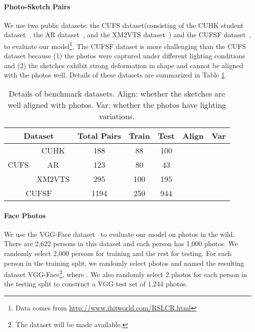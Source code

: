 \documentclass[runningheads]{llncs}
\newcommand{\cmark}{\ding{51}}
\newcommand{\xmark}{\ding{55}}
\begin{document}
\paragraph{Photo-Sketch Pairs} We use two public datasets: the CUFS dataset(consisting of the CUHK student dataset~\cite{tang2003face}, the AR dataset~\cite{martinez1998r}, and the XM2VTS dataset~\cite{Messer99xm2vtsdb}) and the CUFSF dataset~\cite{zhang2011coupled}, to evaluate our model\footnote{Data comes from \url{http://www.ihitworld.com/RSLCR.html}}. The CUFSF dataset is more challenging than the CUFS dataset because (1) the photos were captured under different lighting conditions and (2) the sketches exhibit strong deformation in shape and cannot be aligned with the photos well. Details of these datasets are summarized in Table \ref{tab:dataset}.

\begingroup
\renewcommand{\arraystretch}{1.}
\begin{table}[htbp]
\footnotesize
\caption{Details of benchmark datasets. Align: whether the sketches are well aligned with photos. Var: whether the photos have lighting variations.} \label{tab:dataset}
\centering
\begin{tabular}{c|c|ccccc}
\hline
\multicolumn{2}{c|}{Dataset} & Total Pairs  & Train & Test & Align  & Var   \\ \hline
\multirow{3}{*}{CUFS} &  CUHK    & 188    & 88    & 100  & \cmark & \xmark  \\ \cline{2-7}
&  AR      & 123    & 80    & 43   & \cmark & \xmark  \\ \cline{2-7}
&  XM2VTS  & 295    & 100   & 195  & \xmark & \xmark \\ \cline{1-7}
\multicolumn{2}{c|}{CUFSF}& 1194    & 250   & 944  & \xmark & \cmark   \\ \hline
\end{tabular}
\end{table}
\endgroup

\paragraph{Face Photos} We use the VGG-Face dataset~\cite{Parkhi15} to evaluate our model on photos in the wild. There are 2,622 persons in this dataset and each person has 1,000 photos. We randomly select 2,000 persons for training and the rest for testing. For each person in the training split, we randomly select  photos and named the resulting dataset VGG-Face\footnote{The dataset will be made available.}, where . We also randomly select 2 photos for each person in the testing split to construct a VGG test set of 1,244 photos.
\end{document}
